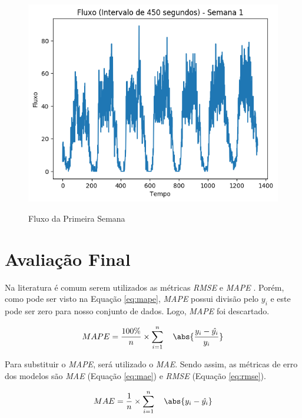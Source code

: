 \begin{figure}[H]
    \centering
    \includegraphics[scale=1]{monography/img/flows/flow_450_week_01.png}
    \label{figure:flow_discution}
    \caption[Fluxo da Primeira Semana]{Fluxo da Primeira Semana}
\end{figure}

\section{Avaliação Final}

Na literatura é comum serem utilizados as métricas \textit{\acrfull{RMSE}} e \textit{\acrfull{MAPE}} \cite{lana_2018}. Porém, como pode ser visto na Equação \ref{eq:mape}, \textit{\acrshort{MAPE}} possui divisão pelo \({y_i}\) e este pode ser zero para nosso conjunto de dados. Logo, \textit{\acrshort{MAPE}} foi descartado. 

\begin{equation}
\label{eq:mape}
MAPE = \frac{100\%}{n} \times \sum_{i=1}^{n} \quad \abs{\frac{y_i - \hat{y_i}}{y_i}}
\end{equation}

Para substituir o \textit{\acrshort{MAPE}}, será utilizado o \textit{\acrfull{MAE}}. Sendo assim, as métricas de erro dos modelos são \textit{\acrshort{MAE}} (Equação \ref{eq:mae}) e \textit{\acrshort{RMSE}} (Equação \ref{eq:rmse}).

\begin{equation}
\label{eq:mae}
MAE = \frac{1}{n} \times \sum_{i=1}^{n} \quad \abs{y_i - \hat{y_i}}
\end{equation}

